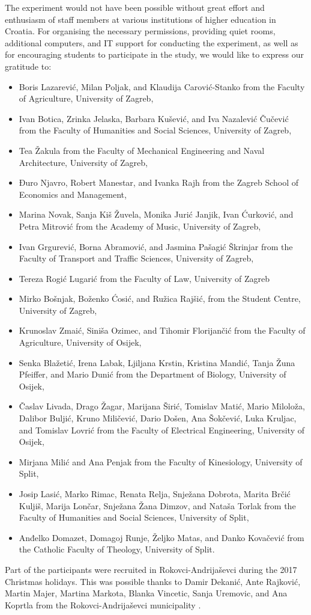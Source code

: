 The experiment would not have been possible without great effort and enthusiasm of staff members at various institutions of higher education in Croatia. For organising the necessary permissions, providing quiet rooms, additional computers, and IT support for conducting the experiment, as well as for encouraging students to participate in the study, we would like to express our gratitude to:
\begin{itemize}
\renewcommand\labelitemi{-}
    \item  Boris Lazarević, Milan Poljak, and Klaudija Carović-Stanko from the Faculty of Agriculture, University of Zagreb,
    \item  Ivan Botica, Zrinka Jelaska, Barbara Kušević, and Iva Nazalević Čučević from the Faculty of Humanities and Social Sciences, University of Zagreb,
    \item  Tea Žakula from the Faculty of Mechanical Engineering and Naval Architecture, University of Zagreb,
    \item  Đuro Njavro, Robert Manestar, and Ivanka Rajh from the Zagreb School of Economics and Management,
    \item  Marina Novak, Sanja Kiš Žuvela, Monika Jurić Janjik, Ivan Ćurković, and Petra Mitrović from the Academy of Music, University of Zagreb,
    \item  Ivan Grgurević, Borna Abramović, and Jasmina Pašagić Škrinjar from the Faculty of Transport and Traffic Sciences, University of Zagreb,
    \item  Tereza Rogić Lugarić from the Faculty of Law, University of Zagreb
    \item  Mirko Bošnjak, Boženko Ćosić, and Ružica Rajšić, from the Student Centre, University of Zagreb,
    \item  Krunoslav Zmaić, Siniša Ozimec, and Tihomir Florijančić from the Faculty of Agriculture, University of Osijek,
    \item  Senka Blažetić, Irena Labak, Ljiljana Krstin, Kristina Mandić, Tanja Žuna Pfeiffer, and Mario Dunić from the Department of Biology, University of Osijek,
    \item  Časlav Livada, Drago Žagar, Marijana Širić, Tomislav Matić, Mario Miloloža, Dalibor Buljić, Kruno Miličević, Dario Došen, Ana Šokčević, Luka Kruljac, and Tomislav Lovrić from the Faculty of Electrical Engineering, University of Osijek,
    \item  Mirjana Milić and Ana Penjak from the Faculty of Kinesiology, University of Split,
    \item  Josip Lasić, Marko Rimac, Renata Relja, Snježana Dobrota, Marita Brčić Kuljiš, Marija Lončar, Snježana Žana Dimzov, and Nataša Torlak from the Faculty of Humanities and Social Sciences, University of Split,
    \item  Anđelko Domazet, Domagoj Runje, Željko Matas, and Danko Kovačević from the Catholic Faculty of Theology, University of Split.
\end{itemize}
Part of the participants were recruited in Rokovci-Andrijaševci during the 2017 Christmas holidays. This was possible thanks to Damir Dekanić, Ante Rajković, Martin Majer, Martina Markota, Blanka Vincetic, Sanja Uremovic, and Ana Koprtla from the Rokovci-Andrijaševci municipality . 

